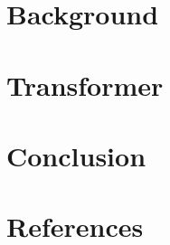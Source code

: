 \section[Back]{Background}


\section[Trs]{Transformer}



\section[Cncl]{Conclusion}


\section[Refs]{References}
